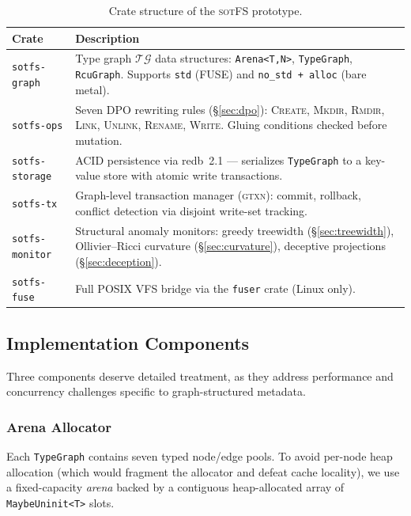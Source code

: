 \documentclass[11pt,a4paper]{article}
\theoremstyle{definition}
\newcommand{\TG}{\ensuremath{\mathcal{TG}}}
\newcommand{\sotfs}{\textsc{sotFS}}
\newcommand{\GTXN}{\textsc{gtxn}}
\begin{document}
\begin{table}[h]
\centering
\caption{Crate structure of the \sotfs{} prototype.}
\label{tab:crates}
\begin{tabularx}{\textwidth}{lX}
\toprule
\textbf{Crate} & \textbf{Description} \\
\midrule
\texttt{sotfs-graph}   & Type graph $\TG$ data structures: \texttt{Arena<T,N>}, \texttt{TypeGraph}, \texttt{RcuGraph}. Supports \texttt{std} (FUSE) and \texttt{no\_std + alloc} (bare metal). \\
\texttt{sotfs-ops}     & Seven DPO rewriting rules (\S\ref{sec:dpo}): \textsc{Create}, \textsc{Mkdir}, \textsc{Rmdir}, \textsc{Link}, \textsc{Unlink}, \textsc{Rename}, \textsc{Write}. Gluing conditions checked before mutation. \\
\texttt{sotfs-storage} & ACID persistence via redb~2.1 --- serializes \texttt{TypeGraph} to a key-value store with atomic write transactions. \\
\texttt{sotfs-tx}      & Graph-level transaction manager (\GTXN{}): commit, rollback, conflict detection via disjoint write-set tracking. \\
\texttt{sotfs-monitor} & Structural anomaly monitors: greedy treewidth (\S\ref{sec:treewidth}), Ollivier--Ricci curvature (\S\ref{sec:curvature}), deceptive projections (\S\ref{sec:deception}). \\
\texttt{sotfs-fuse}    & Full POSIX VFS bridge via the \texttt{fuser} crate (Linux only). \\
\bottomrule
\end{tabularx}
\end{table}

\subsection{Implementation Components}\label{sec:impl-components}

Three components deserve detailed treatment, as they address performance and
concurrency challenges specific to graph-structured metadata.

\subsubsection{Arena Allocator}

Each \texttt{TypeGraph} contains seven typed node/edge pools.  To avoid
per-node heap allocation (which would fragment the allocator and defeat
cache locality), we use a fixed-capacity \emph{arena} backed by a contiguous
heap-allocated array of \texttt{MaybeUninit<T>} slots.
\end{document}
